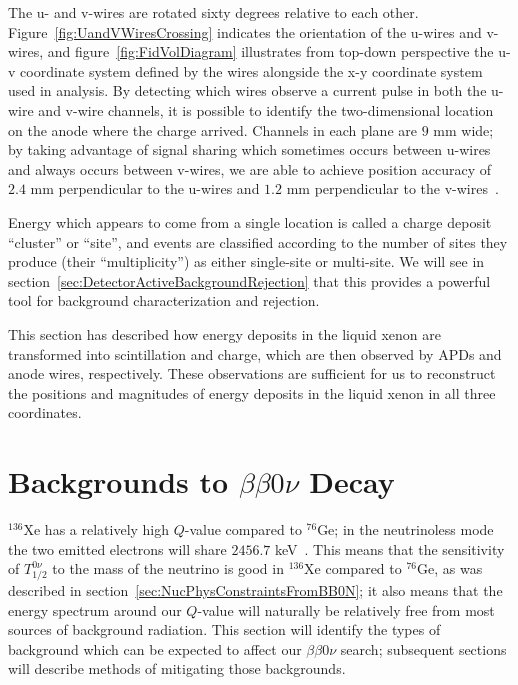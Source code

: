 The u- and v-wires are rotated sixty degrees relative to each other.  Figure~\ref{fig:UandVWiresCrossing} indicates the orientation of the u-wires and v-wires, and figure~\ref{fig:FidVolDiagram} illustrates from top-down perspective the u-v coordinate system defined by the wires alongside the x-y coordinate system used in analysis.  By detecting which wires observe a current pulse in both the u-wire and v-wire channels, it is possible to identify the two-dimensional location on the anode where the charge arrived.  Channels in each plane are $9$ mm wide; by taking advantage of signal sharing which sometimes occurs between u-wires and always occurs between v-wires, we are able to achieve position accuracy of $2.4$ mm perpendicular to the u-wires and $1.2$ mm perpendicular to the v-wires~\cite{bb2nEXO2014}.

Energy which appears to come from a single location is called a charge deposit ``cluster'' or ``site'', and events are classified according to the number of sites they produce (their ``multiplicity'') as either single-site or multi-site.  We will see in section~\ref{sec:DetectorActiveBackgroundRejection} that this provides a powerful tool for background characterization and rejection.

This section has described how energy deposits in the liquid xenon are transformed into scintillation and charge, which are then observed by APDs and anode wires, respectively.  These observations are sufficient for us to reconstruct the positions and magnitudes of energy deposits in the liquid xenon in all three coordinates.

\section{Backgrounds to \texorpdfstring{$\beta\beta 0\nu$}{Neutrinoless Double-Beta} Decay}\label{sec:DetectorBackgrounds}

$^{136}$Xe has a relatively high $Q$-value compared to $^{76}$Ge; in the neutrinoless mode the two emitted electrons will share $2456.7$ keV~\cite{NewEXObb0nPaper_2014}.  This means that the sensitivity of $T_{1/2}^{0\nu}$ to the mass of the neutrino is good in $^{136}$Xe compared to $^{76}$Ge, as was described in section~\ref{sec:NucPhysConstraintsFromBB0N}; it also means that the energy spectrum around our $Q$-value will naturally be relatively free from most sources of background radiation.  This section will identify the types of background which can be expected to affect our $\beta\beta 0\nu$ search; subsequent sections will describe methods of mitigating those backgrounds.

